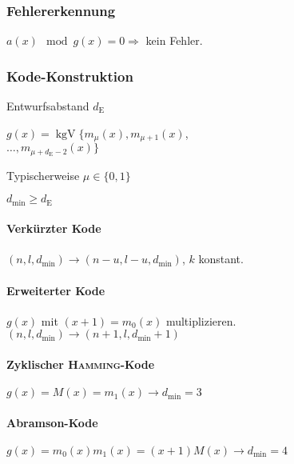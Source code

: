 \documentclass[8pt,a4paper,landscape]{extarticle}
\DeclareMathOperator*{\kgV}{kgV}
\begin{document}
\begin{multicols*}{6}
\subsubsection{Fehlererkennung}
$a(x) \mod g(x) = 0 \Rightarrow $ kein Fehler.

\subsubsection{Kode-Konstruktion}
Entwurfsabstand $d_\text{E}$

$g(x) = \kgV \lbrace m_{\mu}(x), m_{\mu + 1}(x)$, \\ $\dots{}, m_{\mu + d_\text{E} - 2}(x) \rbrace$

Typischerweise $\mu \in \lbrace 0, 1 \rbrace$

$d_\text{min} \ge d_\text{E}$

\paragraph{Verkürzter Kode}
$(n, l, d_\text{min}) \rightarrow (n - u, l - u, d_\text{min})$, $k$ konstant.

\paragraph{Erweiterter Kode}
$g(x)$ mit $(x + 1) = m_0(x)$ multiplizieren.
$(n,l, d_\text{min}) \rightarrow (n+1, l, d_\text{min} + 1)$

\paragraph{Zyklischer \textsc{Hamming}-Kode}
$g(x) = M(x) = m_1(x) \rightarrow d_\text{min} = 3$

\paragraph{Abramson-Kode}
$g(x) = m_0(x) m_1(x) = (x + 1) M(x) \rightarrow d_\text{min} = 4$

\end{multicols*}
\end{document}

